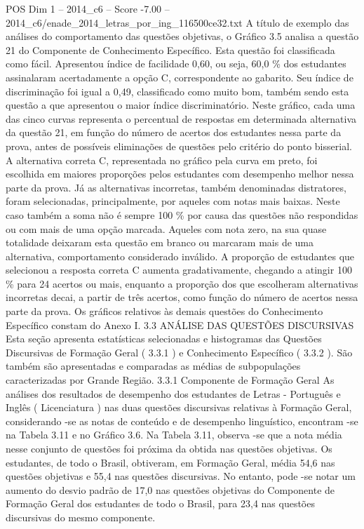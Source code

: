 \begin{textsample}{POS Dim 1 – 2014\_c6 – Score -7.00 – 2014\_c6/enade\_2014\_letras\_por\_ing\_116500ce32.txt}
A título de exemplo das análises do comportamento das questões objetivas, o Gráfico 3.5 analisa a questão 21 do Componente de Conhecimento Específico.
Esta questão foi classificada como fácil.
Apresentou índice de facilidade 0,60, ou seja, 60,0 \% dos estudantes assinalaram acertadamente a opção C, correspondente ao gabarito.
Seu índice de discriminação foi igual a 0,49, classificado como muito bom, também sendo esta questão a que apresentou o maior índice discriminatório.
Neste gráfico, cada uma das cinco curvas representa o percentual de respostas em determinada alternativa da questão 21, em função do número de acertos dos estudantes nessa parte da prova, antes de possíveis eliminações de questões pelo critério do ponto bisserial.
A alternativa correta C, representada no gráfico pela curva em preto, foi escolhida em maiores proporções pelos estudantes com desempenho melhor nessa parte da prova.
Já as alternativas incorretas, também denominadas distratores, foram selecionadas, principalmente, por aqueles com notas mais baixas.
Neste caso também a soma não é sempre 100 \% por causa das questões não respondidas ou com mais de uma opção marcada.
Aqueles com nota zero, na sua quase totalidade deixaram esta questão em branco ou marcaram mais de uma alternativa, comportamento considerado inválido.
A proporção de estudantes que selecionou a resposta correta C aumenta gradativamente, chegando a atingir 100 \% para 24 acertos ou mais, enquanto a proporção dos que escolheram alternativas incorretas decai, a partir de três acertos, como função do número de acertos nessa parte da prova.
Os gráficos relativos às demais questões do Conhecimento Específico constam do Anexo I. 3.3 ANÁLISE DAS QUESTÕES DISCURSIVAS Esta seção apresenta estatísticas selecionadas e histogramas das Questões Discursivas de Formação Geral ( 3.3.1 ) e Conhecimento Específico ( 3.3.2 ).
São também são apresentadas e comparadas as médias de subpopulações caracterizadas por Grande Região. 3.3.1 Componente de Formação Geral As análises dos resultados de desempenho dos estudantes de Letras - Português e Inglês ( Licenciatura ) nas duas questões discursivas relativas à Formação Geral, considerando -se as notas de conteúdo e de desempenho linguístico, encontram -se na Tabela 3.11 e no Gráfico 3.6.
Na Tabela 3.11, observa -se que a nota média nesse conjunto de questões foi próxima da obtida nas questões objetivas.
Os estudantes, de todo o Brasil, obtiveram, em Formação Geral, média 54,6 nas questões objetivas e 55,4 nas questões discursivas.
No entanto, pode -se notar um aumento do desvio padrão de 17,0 nas questões objetivas do Componente de Formação Geral dos estudantes de todo o Brasil, para 23,4 nas questões discursivas do mesmo componente.

\end{textsample}
